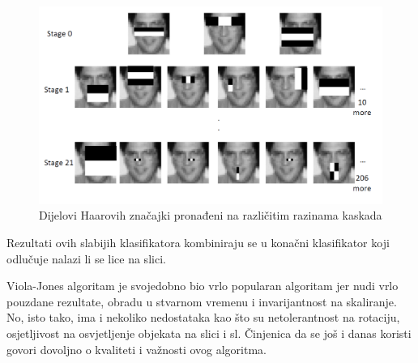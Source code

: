 \begin{figure}[htb]
	\centering
	\includegraphics[width=\linewidth]{img/haar2.jpg}
	\caption{Dijelovi Haarovih značajki pronađeni na različitim razinama kaskada}
	\label{img:haar-cascade-layers}
\end{figure}

Rezultati ovih slabijih klasifikatora kombiniraju se u konačni klasifikator koji odlučuje nalazi li se lice na slici. 

Viola-Jones algoritam je svojedobno bio vrlo popularan algoritam jer nudi vrlo pouzdane rezultate, obradu u stvarnom vremenu i invarijantnost na skaliranje. No, isto tako, ima i nekoliko nedostataka kao što su netolerantnost na rotaciju, osjetljivost na osvjetljenje objekata na slici i sl. Činjenica da se još i danas koristi govori dovoljno o kvaliteti i važnosti ovog algoritma.
